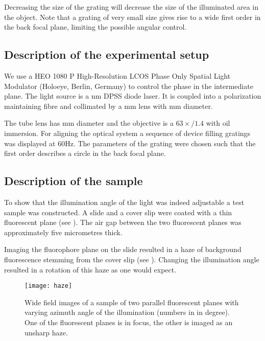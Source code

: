 Decreasing the size of the grating will decrease the size of the
illuminated area in the object. Note that a grating of very small size
gives rise to a wide first order in the back focal plane, limiting the
possible angular control.
\subsection{Description of the experimental setup}
We use a HEO 1080 P High-Resolution LCOS Phase Only Spatial Light
Modulator (Holoeye, Berlin, Germany) to control the phase in the
intermediate plane. The light source is a \unit[473]{nm} DPSS diode
laser. It is coupled into a polarization maintaining fibre and
collimated by a \unit[150]{mm} lens with \unit[50]{mm} diameter.

The tube lens has \unit[300]{mm} diameter and the objective is a
$63\times/1.4$ with oil immersion.  For aligning the optical system a
sequence of device filling gratings was displayed at 60Hz. The
parameters of the grating were chosen such that the first order
describes a circle in the back focal plane.

\subsection{Description of the sample}
To show that the illumination angle of the light was indeed adjustable
a test sample was constructed. A slide and a cover slip were coated
with a thin fluorescent plane (see ). The air
gap between the two fluorescent planes was approximately five
micrometres thick.

Imaging the fluorophore plane on the slide resulted in a haze of
background fluorescence stemming from the cover slip (see
). Changing the illumination angle resulted in a
rotation of this haze as one would expect.
\begin{figure}
  \centering
  \texttt{[image: haze]}
  \caption{Wide field images of a sample of two parallel fluorescent
    planes with varying azimuth angle of the illumination (numbers in
    in degree). One of the fluorescent planes is in focus, the other
    is imaged as an unsharp haze.}
  \label{fig:holo-meas}
\end{figure}

